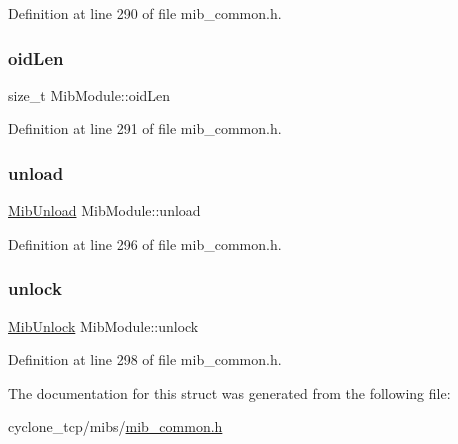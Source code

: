 Definition at line 290 of file mib\+\_\+common.\+h.

\mbox{\label{structMibModule_ae4a7638d531b2257272e960d175d53fb}} 
\subsubsection{\texorpdfstring{oid\+Len}{oidLen}}
{\footnotesize\ttfamily size\+\_\+t Mib\+Module\+::oid\+Len}



Definition at line 291 of file mib\+\_\+common.\+h.

\mbox{\label{structMibModule_ad724f3fb653cd8e9020156944c24abdf}} 
\subsubsection{\texorpdfstring{unload}{unload}}
{\footnotesize\ttfamily \hyperlink{mib__common_8h_a9d19b7401e8455aa458ac4c1e36eecef}{Mib\+Unload} Mib\+Module\+::unload}



Definition at line 296 of file mib\+\_\+common.\+h.

\mbox{\label{structMibModule_a588b8e3a01eb04010cdd8c463d4ed9a3}} 
\subsubsection{\texorpdfstring{unlock}{unlock}}
{\footnotesize\ttfamily \hyperlink{mib__common_8h_ac8e536d17319d4b55310bdaec621a22e}{Mib\+Unlock} Mib\+Module\+::unlock}



Definition at line 298 of file mib\+\_\+common.\+h.



The documentation for this struct was generated from the following file\+:\begin{DoxyCompactItemize}
\item 
cyclone\+\_\+tcp/mibs/\hyperlink{mib__common_8h}{mib\+\_\+common.\+h}\end{DoxyCompactItemize}
